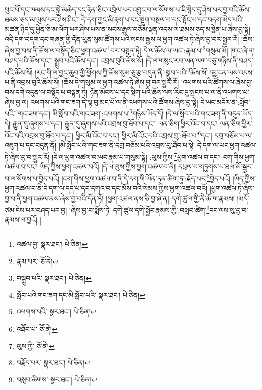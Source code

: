 ཕུང་པོ་དང་ཁམས་དང་སྐྱེ་མཆེད་དང་རྟེན་ཅིང་འབྲེལ་པར་འབྱུང་བ་ལ་སོགས་པ་ཇི་སྙེད་དུ་ཤེས་པར་བྱ་བའི་ཆོས་ཐམས་ཅད་མ་ལུས་པར་ཤེས་ཤིང་། དེ་དག་ཀྱང་མི་རྟག་པ་དང་སྡུག་བསྔལ་བ་དང་སྟོང་པ་དང་བདག་མེད་པའི་མཚན་ཉིད་དུ་ཕྱིན་ཅི་མ་ལོག་པར་ཤེས་པས་ན་སངས་རྒྱས་བཅོམ་ལྡན་འདས་ལ་ཐམས་ཅད་མཁྱེན་པ་ཞེས་བྱ་སྟེ། འདི་དག་བདག་དང་གཞན་གྱི་དོན་ཕུན་སུམ་ཚོགས་པའི་སངས་རྒྱས་ལ་ཕྱག་འཚལ་ཏེ་ཞེས་བྱ་བར་སྦྱར་རོ། །ཆོས་ཞེས་བྱ་བས་ནི་ཆོས་ལ་བསྟོད་ཅིང་ཕྱག་འཚལ་\footnote{འཚལ་བྱ་  སྣར་ཐང་།  པེ་ཅིན། }བར་བསྟན་ཏེ། དེ་ལ་ཆོས་ལ་ཡང་:རྣམ་པ་\footnote{རྣམ་པར་  ཅོ་ནེ། }གསུམ་མོ། །གང་ཞེ་ན། བཤད་པའི་ཆོས་དང་། སྒྲུབ་པའི་ཆོས་དང་། འབྲས་བུའི་ཆོས་སོ། །དེ་ལ་གསུང་རབ་ཡན་ལག་བཅུ་གཉིས་ནི་བཤད་པའི་ཆོས་སོ། །རང་གི་ལ་བྱང་ཆུབ་ཀྱི་ཕྱོགས་ཀྱི་ཆོས་སུམ་ཅུ་རྩ་བདུན་ནི་:སྒྲུབ་པའི་\footnote{བསྒྲུབ་པའི་  སྣར་ཐང་།  པེ་ཅིན། }ཆོས་སོ། །མྱ་ངན་ལས་འདས་པ་ནི་འབྲས་བུའི་ཆོས་སོ། །ཆོས་དེ་གསུམ་ལ་ཕྱག་འཚལ་ཏེ་ཞེས་བྱ་བར་སྦྱར་རོ། །འཕགས་པའི་ཚོགས་ལ་ཞེས་བྱ་བས་དགེ་འདུན་ལ་བསྟོད་པ་བསྟན་ཏེ། ཉོན་མོངས་པ་དང་སྡིག་པའི་ཆོས་ལས་རིང་དུ་སྤངས་པ་ལ་ནི་འཕགས་པ་ཞེས་བྱ་ལ། འཕགས་པའི་གང་ཟག་དེ་ལྟ་བུ་མང་པོ་ལ་ནི་འཕགས་པའི་ཚོགས་ཞེས་བྱ་སྟེ། དེ་ཡང་མདོར་ན་:སློབ་པའི་\footnote{སློབ་པའི་གང་ཟག་དང་མི་སློབ་པའི་  སྣར་ཐང་།  པེ་ཅིན། }གང་ཟག་དང་། མི་སློབ་པའི་གང་ཟག་:འཕགས་པ་\footnote{འཕགས་པའི་  སྣར་ཐང་།  པེ་ཅིན། }གཉིས་ཡོད་དོ། །དེ་ལ་སློབ་པའི་གང་ཟག་ནི་བདུན་ཡོད་དེ། རྒྱུན་དུ་ཞུགས་པ་དང་། རྒྱུན་དུ་ཞུགས་པའི་འབྲས་བུ་ཐོབ་པ་དང་། ལན་ཅིག་ཕྱིར་འོང་བ་དང་། ལན་ཅིག་ཕྱིར་འོང་བའི་འབྲས་བུ་ཐོབ་པ་དང་། ཕྱིར་མི་འོང་བ་དང་། ཕྱིར་མི་འོང་བའི་འབྲས་བུ་:ཐོབ་པ་\footnote{འཐོབ་པ་  ཅོ་ནེ། }དང་། དགྲ་བཅོམ་པ་ལ་འཇུག་པ་དང་བདུན་ནོ། །མི་སློབ་པའི་གང་ཟག་ནི་དགྲ་བཅོམ་པའི་འབྲས་བུ་ཐོབ་པ་སྟེ། དེ་དག་ལ་ཡང་ཕྱག་འཚལ་ཏེ་ཞེས་བྱ་བ་སྦྱར་རོ། །དེ་ལ་ཕྱག་འཚལ་བ་ཡང་རྣམ་པ་གསུམ་སྟེ། :ལུས་ཀྱིས་\footnote{ལུས་ཀྱི་  ཅོ་ནེ། }ཕྱག་འཚལ་བ་དང་། ངག་གིས་ཕྱག་འཚལ་བ་དང་། ཡིད་ཀྱིས་ཕྱག་འཚལ་བའོ། །དེ་ལ་ལུས་ཀྱིས་ཕྱག་འཚལ་བ་ནི། དཔྲལ་བ་གཏུགས་པ་ཐལ་མོ་སྦྱར་བ་ལ་སོགས་པ་བྱེད་པའོ། །ངག་གིས་ཕྱག་འཚལ་བ་ནི་དེ་དག་གི་ཡོན་ཏན་ཚིག་ཏུ་:རྗོད་པར་\footnote{བརྗོད་པར་  སྣར་ཐང་།  པེ་ཅིན། }བྱེད་པའོ། །ཡིད་ཀྱིས་ཕྱག་འཚལ་བ་ནི་དེ་དག་ལ་དད་པ་དང་དགའ་བ་དང་མོས་བའི་སེམས་ཀྱིས་ཕྱག་འཚལ་བའོ། །ཕྱག་འཚལ་ཏེ་ཞེས་བྱ་བ་ནི་ཕྱག་འཚལ་ནས་ཞེས་བྱ་བའི་དོན་ཏོ། །ཕྱག་འཚལ་ནས་ཅི་བྱ་ཞེ་ན། དགེ་ཚུལ་གྱི་ནི་ཆོ་ག་རྣམས། །མདོ་ཙམ་ངེས་པར་བཤད་པར་བྱ། །ཞེས་བྱ་བ་སྨོས་ཏེ། དགེ་ཚུལ་དགེ་སྦྱོང་རྣམས་ཀྱི་:བསླབ་ཚིག་\footnote{བསླབ་ཚིགས་  སྣར་ཐང་།  པེ་ཅིན། }དང་ལས་སུ་བྱ་བ་རྣམས་ལ་བྱའོ། །
